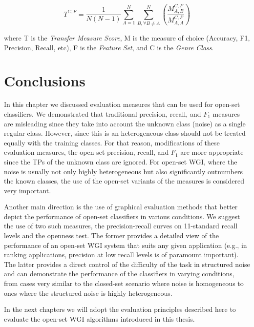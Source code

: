 \begin{equation} \label{chap:eval_methods:eq:office_doc_ensemble}
	T^{C,F} = \frac{1}{N(N-1)} \sum_{A=1}^{N} \sum_{B, \forall B \neq A}^{N} \left(  \frac{M^{C,F}_{A,B}}{M^{C,F}_{A,A}} \right)
\end{equation}

\noindent	
where T is the \textit{Transfer Measure Score}, M is the measure of choice (Accuracy, F1, Precision, Recall, etc), F is the \textit{Feature Set}, and C is the \textit{Genre Class}. 


\section{Conclusions}

In this chapter we discussed evaluation measures that can be used for open-set classifiers. We demonstrated that traditional precision, recall, and $F_{1}$ measures are misleading since they take into account the unknown class (noise) as a single regular class. However, since this is an heterogeneous class should not be treated equally with the training classes. For that reason, modifications of these evaluation measures, the open-set precision, recall, and $F_{1}$ are more appropriate since the TPs of the unknown class are ignored. For open-set WGI, where the noise is usually not only highly heterogeneous but also significantly outnumbers the known classes, the use of the open-set variants of the measures is considered very important.

Another main direction is the use of graphical evaluation methods that better depict the performance of open-set classifiers in various conditions. We suggest the use of two such measures, the precision-recall curves on 11-standard recall levels and the openness test. The former provides a detailed view of the performance of an open-set WGI system that suits any given application (e.g., in ranking applications, precision at low recall levels is of paramount important). The latter provides a direct control of the difficulty of the task in structured noise and can demonstrate the performance of the classifiers in varying conditions, from cases very similar to the closed-set scenario where noise is homogeneous to ones where the structured noise is highly heterogeneous.

In the next chapters we will adopt the evaluation principles described here to evaluate the open-set WGI algorithms introduced in this thesis.